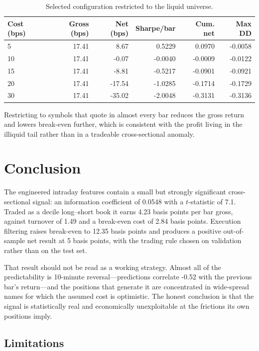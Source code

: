 \documentclass[11pt]{article}
\begin{document}
\begin{table}[!htbp]
\centering
\small
\caption{Selected configuration restricted to the liquid universe.}
\label{tab:liquid}
\begin{tabular}{lrrrrr}
\toprule
Cost (bps) & Gross (bps) & Net (bps) & Sharpe/bar & Cum. net & Max DD \\
\midrule
5 & 17.41 & 8.67 & 0.5229 & 0.0970 & -0.0058 \\
10 & 17.41 & -0.07 & -0.0040 & -0.0009 & -0.0122 \\
15 & 17.41 & -8.81 & -0.5217 & -0.0901 & -0.0921 \\
20 & 17.41 & -17.54 & -1.0285 & -0.1714 & -0.1729 \\
30 & 17.41 & -35.02 & -2.0048 & -0.3131 & -0.3136 \\
\bottomrule
\end{tabular}
\end{table}

Restricting to symbols that quote in almost every bar reduces the gross return
and lowers break-even further, which is consistent with the profit living in
the illiquid tail rather than in a tradeable cross-sectional anomaly.

\FloatBarrier
\section{Conclusion}

The engineered intraday features contain a small but strongly significant
cross-sectional signal: an information coefficient of 0.0548 with a
$t$-statistic of 7.1. Traded as a decile long--short book it earns
4.23 basis points per bar gross, against turnover of 1.49 and a
break-even cost of 2.84 basis points. Execution filtering raises
break-even to 12.35 basis points and produces a positive out-of-sample
net result at 5 basis points, with the trading rule chosen on validation rather
than on the test set.

That result should not be read as a working strategy. Almost all of the
predictability is 10-minute reversal---predictions correlate -0.52 with the
previous bar's return---and the positions that generate it are concentrated in
wide-spread names for which the assumed cost is optimistic. The honest
conclusion is that the signal is statistically real and economically
unexploitable at the frictions its own positions imply.

\subsection*{Limitations}
\end{document}
